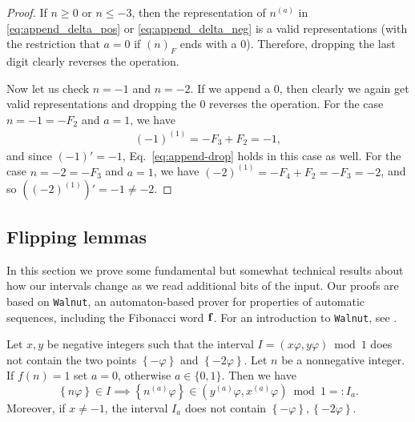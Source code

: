 \documentclass[12pt,runningheads]{llncs}
\renewcommand{\phi}{\varphi}
\newcommand{\fract}[1]{\left\{ #1 \right\}}
\newcommand{\ndelta}{n^{(a)}}
\newcommand{\append}[2]{#1^{(#2)}}
\begin{document}
\begin{proof}%
If $n\geq 0$ or $n\leq -3$, then the representation of $\ndelta$ in \eqref{eq:append_delta_pos} or \eqref{eq:append_delta_neg} is a valid representations (with the restriction that $a=0$ if $(n)_F$ ends with a $0$).
Therefore, dropping the last digit clearly reverses the operation.

Now let us check $n = -1$ and $n = -2$. If we append a $0$, then clearly we again get valid representations and dropping the $0$ reverses the operation.
For the case $n = -1 = -F_2$ and $a = 1$, we have
\begin{align*}
    \append{(-1)}{1}
    = -F_3 + F_2
    = -1,
\end{align*}
and since $(-1)' = -1$, Eq.~\eqref{eq:append-drop} holds in this case as well. 
For the case $n = -2 = -F_3$ and $a= 1$, we have $\append{(-2)}{1}= -F_4 + F_2 = -F_3= -2$, 
and so $(\append{(-2)}{1})' = -1 \neq -2$.
\end{proof}



\subsection{Flipping lemmas}

In this section we prove some fundamental but somewhat technical results about how our intervals change as we read additional bits of the input.  Our proofs are based on {\tt Walnut}, an automaton-based prover for properties of automatic sequences, including the Fibonacci word $\bf f$. For an introduction to {\tt Walnut}, see \cite{Shallit:2023}.

\begin{lemma}\label{lem:flip_append}
Let $x,y$ be negative integers such that the interval $I = (x \phi,y \phi) \bmod 1$ does not contain the two points $\fract{-\phi}$ and $\fract{-2\phi}$.
Let $n$ be a nonnegative integer. If $f(n) = 1$ set $a=0$, otherwise $a \in \{0,1\}$.
Then we have
\begin{equation}\label{eq:flip_append}
    \fract{n\phi} \in I
    \implies
    \fract{\ndelta\phi} \in (\append{y}{a} \phi, \append{x}{a} \phi)\bmod 1
    =: I_a.
\end{equation}
Moreover, if $x\neq -1$, the interval $I_a$ does not contain $\fract{-\phi}, \fract{-2\phi}$.
\end{lemma}
\end{document}

